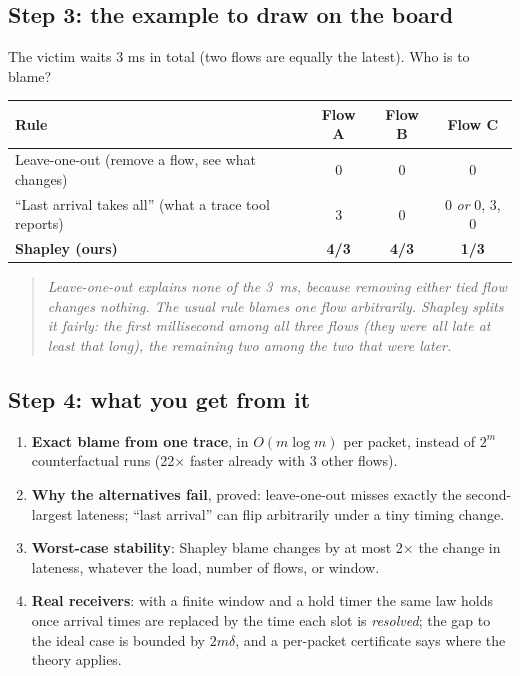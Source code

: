 \documentclass[11pt]{article}
\newcommand{\say}[1]{\begin{quote}\itshape #1\end{quote}}
\begin{document}
\subsection*{Step 3: the example to draw on the board}
\begin{center}
\end{center}
The victim waits 3 ms in total (two flows are equally the latest). Who is to blame?
\begin{center}
\begin{tabular}{lccc}
\toprule
Rule & Flow A & Flow B & Flow C\\
\midrule
Leave-one-out (remove a flow, see what changes) & 0 & 0 & 0\\
``Last arrival takes all'' (what a trace tool reports) & 3 & 0 & 0 \emph{or} 0, 3, 0\\
\textbf{Shapley (ours)} & \textbf{4/3} & \textbf{4/3} & \textbf{1/3}\\
\bottomrule
\end{tabular}
\end{center}
\say{Leave-one-out explains none of the 3~ms, because removing either tied flow changes nothing. The usual rule blames one flow arbitrarily. Shapley splits it fairly: the first millisecond among all three flows (they were all late at least that long), the remaining two among the two that were later.}

\subsection*{Step 4: what you get from it}
\begin{enumerate}
\item \textbf{Exact blame from one trace}, in $O(m\log m)$ per packet, instead of $2^m$ counterfactual runs (22$\times$ faster already with 3 other flows).
\item \textbf{Why the alternatives fail}, proved: leave-one-out misses exactly the second-largest lateness; ``last arrival'' can flip arbitrarily under a tiny timing change.
\item \textbf{Worst-case stability}: Shapley blame changes by at most 2$\times$ the change in lateness, whatever the load, number of flows, or window.
\item \textbf{Real receivers}: with a finite window and a hold timer the same law holds once arrival times are replaced by the time each slot is \emph{resolved}; the gap to the ideal case is bounded by $2m\delta$, and a per-packet certificate says where the theory applies.
\end{enumerate}
\end{document}
